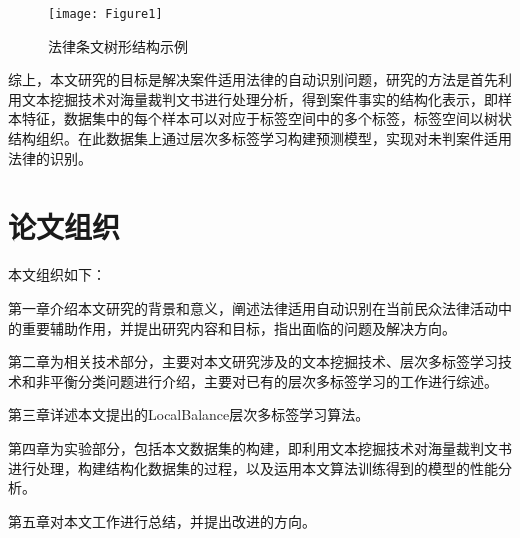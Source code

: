     \begin{figure}[ht]
        \centering
        \texttt{[image: Figure1]}\\
        \caption{法律条文树形结构示例}\label{Figure1}
    \end{figure}
    
    综上，本文研究的目标是解决案件适用法律的自动识别问题，研究的方法是首先利用文本挖掘技术对海量裁判文书进行处理分析，得到案件事实的结构化表示，即样本特征，数据集中的每个样本可以对应于标签空间中的多个标签，标签空间以树状结构组织。在此数据集上通过层次多标签学习构建预测模型，实现对未判案件适用法律的识别。


    \section{论文组织}
    本文组织如下：

    第一章介绍本文研究的背景和意义，阐述法律适用自动识别在当前民众法律活动中的重要辅助作用，并提出研究内容和目标，指出面临的问题及解决方向。

    第二章为相关技术部分，主要对本文研究涉及的文本挖掘技术、层次多标签学习技术和非平衡分类问题进行介绍，主要对已有的层次多标签学习的工作进行综述。

    第三章详述本文提出的LocalBalance层次多标签学习算法。

    第四章为实验部分，包括本文数据集的构建，即利用文本挖掘技术对海量裁判文书进行处理，构建结构化数据集的过程，以及运用本文算法训练得到的模型的性能分析。

    第五章对本文工作进行总结，并提出改进的方向。
